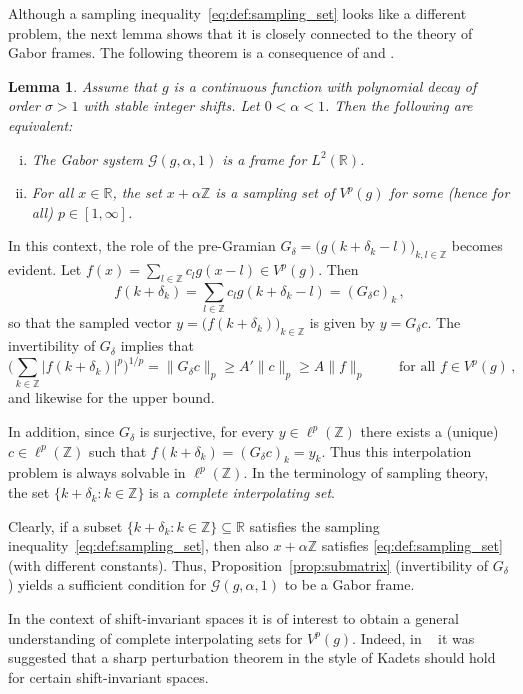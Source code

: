 \documentclass[reqno,a4paper,12pt]{amsart}
\numberwithin{equation}{section}
\newtheorem{lemma}[definition]{Lemma}
\def\Z{{\mathbb Z}}
\def\R{{\mathbb R}}
\newcommand\1{\mathds{1}}
\newcommand{\cG}{\mathcal{G}}
\begin{document}
Although a sampling inequality~\eqref{eq:def:sampling_set} looks like
a different problem, the next lemma shows that it  is
closely connected to the theory of Gabor frames.
The following theorem is a consequence of \cite[Thm.~3.1, Thm.~3.3]{GroechenigEtAl2017} and \cite[Rem.~5.2]{GroechenigEtAl2015}.
\begin{lemma}\label{thm:Gabor_vs_Sampling}
Assume that $g$ is a continuous function with polynomial decay of
order $\sigma>1$ with  stable integer shifts.
Let $0<\alpha<1$. Then the following are equivalent:
\begin{enumerate}[(i)]
\item The Gabor system $\cG(g, \alpha,1)$ 
is a frame for $L^2(\R)$.
\item For all $x\in\R$, the set $x+\alpha\Z$ is a sampling set of
  $V^p(g)$ for some (hence for all) $p\in[1,\infty]$.
\end{enumerate}
\end{lemma}
In this context, the role of the pre-Gramian $G_{\delta } =
\big(g(k+\delta _k -l)\big)_{k,l\in\Z} $ becomes evident. Let $f(x) =
\sum _{l\in\Z} c_l g(x-l) \in V^p(g)$. Then
$$
f(k+\delta _k) = \sum _{l\in\Z} c_l g(k+\delta _k - l) = (G_\delta
c)_k \, ,
$$
so that the sampled vector $y = \big(f(k+\delta _k)\big)_{k\in \Z }$ is given by $y=
G_\delta c$.
The invertibility of $G_\delta $ implies that
$$
\Big(\sum _{k\in \Z} |f(k+\delta _k)|^p \Big) ^{1/p} = \|G_\delta c \|_p \geq
A'\|c\|_p \geq A \|f\|_p
\qquad \text{ for all }  f \in V^p(g) \, ,
$$
and likewise for the upper bound. 

In addition, since $G_\delta $ is surjective, for every $y \in \ell
^p(\Z )$ there exists a (unique)  $c\in \ell ^p(\Z)$ such that $f(k+\delta _k) =
(G_\delta c )_k = y_k$. Thus this interpolation problem is always
solvable in $\ell ^p(\Z )$. In the terminology of sampling theory, the
set $\{k+\delta _k : k\in \Z \}$ is a \emph{complete interpolating set}. 

Clearly, if a subset $\{k+\delta _k : k\in \Z \}\subseteq \R $
satisfies the  sampling inequality~\eqref{eq:def:sampling_set}, then also $x+\alpha
\Z $ satisfies \eqref{eq:def:sampling_set} (with different
constants). Thus, Proposition~\ref{prop:submatrix} (invertibility of $G_\delta $)
yields a sufficient  condition for $\mathcal{G} (g, \alpha , 1)$ to be
a Gabor frame.

In the context of shift-invariant spaces it is of interest to obtain a
general 
understanding of   complete interpolating sets for $V^p(g)$. Indeed,
in ~\cite{Gro26} it was suggested that a sharp perturbation theorem in
the style of Kadets should hold for certain shift-invariant spaces.
\end{document}
